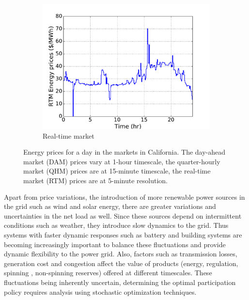 \documentclass[11pt,twoside]{article}
\begin{document}
\begin{figure}[h!tp]
\begin{subfigure}[b]{0.32\textwidth} \includegraphics[width=\textwidth]{Figures/rtmprices.pdf} \caption{Real-time market}\label{rtmprices}\end{subfigure} \hfill
\caption{Energy prices for a day in the markets in California. The day-ahead market (DAM) prices vary at 1-hour timescale, the quarter-hourly market (QHM) prices are at 15-minute timescale, the real-time market (RTM) prices are at 5-minute resolution.}\label{eprices}
\end{figure}

Apart from price variations, the introduction of more renewable power sources in the grid such as wind and solar energy, there are greater variations and uncertainties in the net load as well. Since these sources depend on intermittent conditions such as weather, they introduce slow dynamics to the grid. Thus systems with faster dynamic responses such as battery and building systems are becoming increasingly important to balance these fluctuations and provide dynamic flexibility to the power grid. Also, factors such as transmission losses, generation cost and congestion affect the value of products (energy, regulation, spinning , non-spinning reserves) offered at different timescales. These fluctuations being inherently uncertain, determining the optimal participation policy requires analysis using stochastic optimization techniques.
\end{document}
